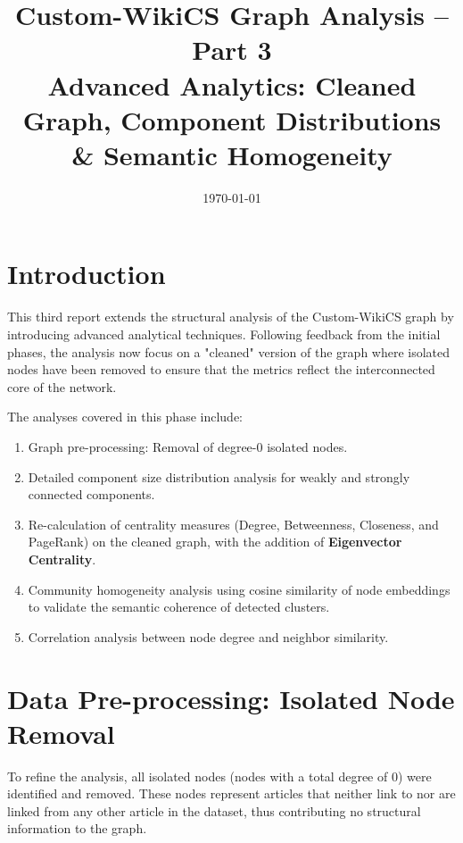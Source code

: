\documentclass[12pt,a4paper]{article}
\title{Custom-WikiCS Graph Analysis -- Part 3\\[4pt]
\large Advanced Analytics: Cleaned Graph, Component Distributions \& Semantic Homogeneity}
\author{}
\date{\today}
\begin{document}
\maketitle

\section{Introduction}

This third report extends the structural analysis of the Custom-WikiCS graph by introducing advanced analytical techniques. Following feedback from the initial phases, the analysis now focus on a "cleaned" version of the graph where isolated nodes have been removed to ensure that the metrics reflect the interconnected core of the network.

The analyses covered in this phase include:
\begin{enumerate}
    \item Graph pre-processing: Removal of degree-0 isolated nodes.
    \item Detailed component size distribution analysis for weakly and strongly connected components.
    \item Re-calculation of centrality measures (Degree, Betweenness, Closeness, and PageRank) on the cleaned graph, with the addition of \textbf{Eigenvector Centrality}.
    \item Community homogeneity analysis using cosine similarity of node embeddings to validate the semantic coherence of detected clusters.
    \item Correlation analysis between node degree and neighbor similarity.
\end{enumerate}

\section{Data Pre-processing: Isolated Node Removal}

To refine the analysis, all isolated nodes (nodes with a total degree of 0) were identified and removed. These nodes represent articles that neither link to nor are linked from any other article in the dataset, thus contributing no structural information to the graph.
\end{document}
